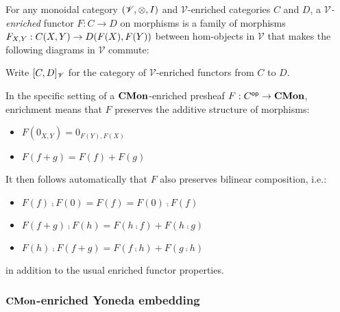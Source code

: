 \begin{definition}
For any monoidal category $(\mathscr{V}, \otimes, I)$ and $\mathscr{V}$-enriched categories $C$ and $D$, a
\emph{$\mathscr{V}$-enriched} functor $F: C \to D$ on morphisms is a family of morphisms $F_{X,Y}:
{C}(X,Y) \to {D}(F(X),F(Y))$ between hom-objects in $\mathscr{V}$ that makes the following diagrams
in $\mathscr{V}$ commute:

\begin{center}
\hspace{5mm}
\end{center}
\end{definition}

Write $[C,D]_{\mathscr{V}}$ for the category of $\mathscr{V}$-enriched functors from $C$ to $D$.

In the specific setting of a $\mathbf{CMon}$-enriched presheaf $F: C^{\mathsf{op}} \to \mathbf{CMon}$, enrichment means that $F$
preserves the additive structure of morphisms:
\begin{itemize}
\item $F(0_{X,Y}) = 0_{F(Y),F(X)}$
\item $F(f + g) = F(f) + F(g)$
\end{itemize}
It then follows automatically that $F$ also preserves bilinear composition, i.e.:
\begin{itemize}
\item $F(f) \comp F(0) = F(f) = F(0) \comp F(f)$
\item $F(f + g) \comp F(h) = F(h \comp f) + F(h \comp g)$
\item $F(h) \comp F(f + g) = F(f \comp h) + F(g \comp h)$
\end{itemize}
in addition to the usual enriched functor properties.

\subsubsection{$\mathbf{CMon}$-enriched Yoneda embedding}

